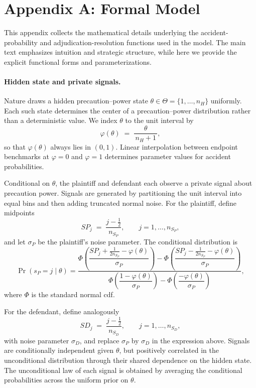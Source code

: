 \documentclass{article}
\begin{document}
\section*{Appendix A: Formal Model}

This appendix collects the mathematical details underlying the accident-probability and adjudication-resolution functions used in the model. The main text emphasizes intuition and strategic structure, while here we provide the explicit functional forms and parameterizations.

\paragraph{Hidden state and private signals.}
Nature draws a hidden precaution–power state $\theta \in \Theta = \{1,\dots,n_H\}$ uniformly. Each such state determines the center of a precaution–power distribution rather than a deterministic value. We index $\theta$ to the unit interval by
\[
\varphi(\theta) \;=\; \frac{\theta}{\,n_H+1\,},
\]
so that $\varphi(\theta)$ always lies in $(0,1)$. Linear interpolation between endpoint benchmarks at $\varphi=0$ and $\varphi=1$ determines parameter values for accident probabilities.

Conditional on $\theta$, the plaintiff and defendant each observe a private signal about precaution power. Signals are generated by partitioning the unit interval into equal bins and then adding truncated normal noise. For the plaintiff, define midpoints
\[
SP_j \;=\; \frac{j-\tfrac{1}{2}}{n_{S_P}}, \qquad j=1,\dots,n_{S_P},
\]
and let $\sigma_{P}$ be the plaintiff’s noise parameter. The conditional distribution is
\[
\Pr(s_P=j \mid \theta)
=
\frac{
\Phi\!\left(\dfrac{SP_j+\tfrac{1}{2n_{S_P}}-\varphi(\theta)}{\sigma_{P}}\right)
-
\Phi\!\left(\dfrac{SP_j-\tfrac{1}{2n_{S_P}}-\varphi(\theta)}{\sigma_{P}}\right)
}{
\Phi\!\left(\dfrac{1-\varphi(\theta)}{\sigma_{P}}\right)
-
\Phi\!\left(\dfrac{-\varphi(\theta)}{\sigma_{P}}\right)
},
\]
where $\Phi$ is the standard normal cdf. 

For the defendant, define analogously
\[
SD_j \;=\; \frac{j-\tfrac{1}{2}}{n_{S_D}}, \qquad j=1,\dots,n_{S_D},
\]
with noise parameter $\sigma_{D}$, and replace $\sigma_{P}$ by $\sigma_{D}$ in the expression above. Signals are conditionally independent given $\theta$, but positively correlated in the unconditional distribution through their shared dependence on the hidden state. The unconditional law of each signal is obtained by averaging the conditional probabilities across the uniform prior on $\theta$.
\end{document}
